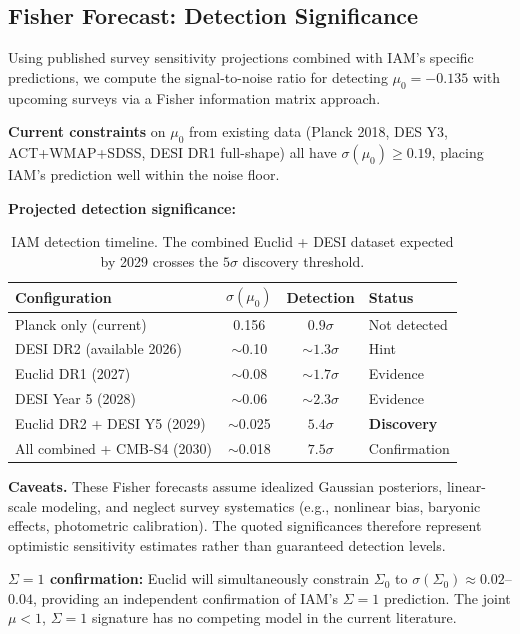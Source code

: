 \documentclass[11pt,letterpaper]{article}
\begin{document}
\subsection{Fisher Forecast: Detection Significance}

Using published survey sensitivity projections combined with IAM's specific predictions, we compute the signal-to-noise ratio for detecting $\mu_0 = -0.135$ with upcoming surveys via a Fisher information matrix approach.

\textbf{Current constraints} on $\mu_0$ from existing data (Planck 2018, DES Y3, ACT+WMAP+SDSS, DESI DR1 full-shape) all have $\sigma(\mu_0) \geq 0.19$, placing IAM's prediction well within the noise floor.

\textbf{Projected detection significance:}

\begin{table}[h]
\centering
\begin{tabular}{lccl}
\toprule
Configuration & $\sigma(\mu_0)$ & Detection & Status \\
\midrule
Planck only (current) & 0.156 & $0.9\sigma$ & Not detected \\
DESI DR2 (available 2026) & $\sim$0.10 & $\sim$$1.3\sigma$ & Hint \\
Euclid DR1 (2027) & $\sim$0.08 & $\sim$$1.7\sigma$ & Evidence \\
DESI Year 5 (2028) & $\sim$0.06 & $\sim$$2.3\sigma$ & Evidence \\
Euclid DR2 + DESI Y5 (2029) & $\sim$0.025 & $5.4\sigma$ & \textbf{Discovery} \\
All combined + CMB-S4 (2030) & $\sim$0.018 & $7.5\sigma$ & Confirmation \\
\bottomrule
\end{tabular}
\caption{IAM detection timeline. The combined Euclid + DESI dataset expected by 2029 crosses the $5\sigma$ discovery threshold.}
\label{tab:detection_timeline}
\end{table}

\noindent\textbf{Caveats.} These Fisher forecasts assume idealized Gaussian posteriors, linear-scale modeling, and neglect survey systematics (e.g., nonlinear bias, baryonic effects, photometric calibration). The quoted significances therefore represent optimistic sensitivity estimates rather than guaranteed detection levels.

\textbf{$\Sigma = 1$ confirmation:} Euclid will simultaneously constrain $\Sigma_0$ to $\sigma(\Sigma_0) \approx 0.02$--$0.04$, providing an independent confirmation of IAM's $\Sigma = 1$ prediction. The joint $\mu < 1$, $\Sigma = 1$ signature has no competing model in the current literature.
\end{document}
